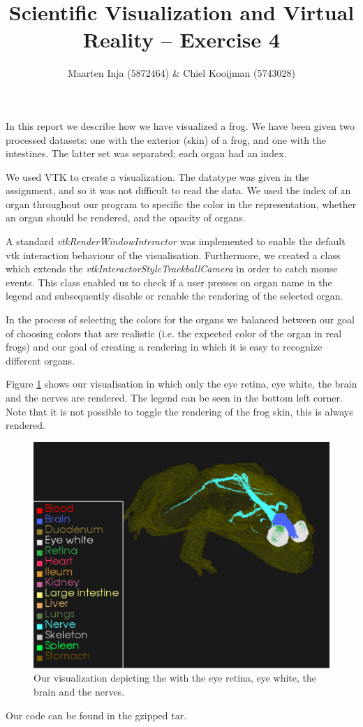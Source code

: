\documentclass{article}[10pt]
\title{Scientific Visualization and Virtual Reality – Exercise 4}
\author{Maarten Inja (5872464) \& Chiel Kooijman (5743028)}
\begin{document}
\maketitle

In this report we describe how we have visualized a frog. We have been given two
processed datasets: one with the exterior (skin) of a frog, and one with the
intestines. The latter set was separated; each organ had an index.

We used VTK to create a visualization. The datatype was given in the
assignment, and so it was not difficult to read the data. We used the index of an
organ throughout our program to specific the color in the representation,
whether an organ should be rendered, and the opacity of organs.

A standard \emph{vtkRenderWindowInteractor} was implemented to enable the default
vtk interaction behaviour of the visualisation. Furthermore, we created a class
which extends the \emph{vtkInteractorStyleTrackballCamera} in order to catch
mouse events. This class enabled us to check if a user presses on organ name in
the legend and subsequently disable or renable the rendering of the selected
organ.

In the process of selecting the colors for the organs we balanced between our
goal of choosing colors that are realistic (i.e. the expected color of the organ
in real frogs) and our goal of creating a rendering in which it is easy to
recognize different organs.

Figure \ref{fig:frog_brain} shows our visualisation in which only the eye retina,
eye white, the brain and the nerves are rendered. The legend can be seen in the
bottom left corner. Note that it is not possible to toggle the rendering of the
frog skin, this is always rendered.

\begin{figure}[h]
    \includegraphics[width=\textwidth]{frog_brain}
    \caption{Our visualization depicting the with the eye retina, eye white, the brain and the nerves.}
    \label{fig:frog_brain}
\end{figure}

Our code can be found in the gzipped tar.
\end{document}
